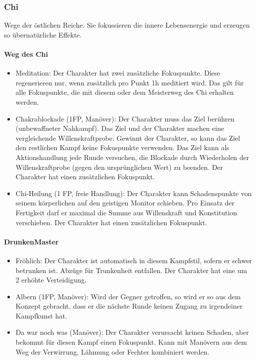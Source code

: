 \documentclass{article}
\begin{document}
\subsubsection{Chi}

Wege der östlichen Reiche. Sie fokussieren die innere Lebensenergie und erzeugen so übernatürliche Effekte.

\paragraph{Weg des Chi}

\begin{itemize}
\item Meditation: Der Charakter hat zwei zusätzliche Fokuspunkte. Diese regenerieren nur, wenn zusätzlich pro Punkt 1h meditiert wird. Das gilt für alle Fokuspunkte, die mit diesem oder dem Meisterweg des Chi erhalten werden.
\item Chakrablockade (1FP, Manöver): Der Charakter muss das Ziel berühren (unbewaffneter Nahkampf). Das Ziel und der Charakter machen eine vergleichende Willenskraftprobe. Gewinnt der Charakter, so kann das Ziel den restlichen Kampf keine Fokuspunkte verwenden. Das Ziel kann als Aktionshandlung jede Runde versuchen, die Blockade durch Wiederholen der Willenskraftprobe (gegen den ursprünglichen Wert) zu beenden. Der Charakter hat einen zusätzlichen Fokuspunkt.
\item Chi-Heilung (1 FP, freie Handlung): Der Charakter kann Schadenspunkte von seinem körperlichen auf den geistigen Monitor schieben. Pro Einsatz der Fertigkeit darf er maximal die Summe aus Willenskraft und Konstitution verschieben. Der Charakter hat einen zusätzlichen Fokuspunkt.
\end{itemize}

\paragraph{DrunkenMaster}

\begin{itemize}
\item Fröhlich: Der Charakter ist automatisch in diesem Kampfstil, sofern er schwer betrunken ist. Abzüge für Trunkenheit entfallen. Der Charakter hat eine um 2 erhöhte Verteidigung.
\item Albern (1FP, Manöver): Wird der Gegner getroffen, so wird er so aus dem Konzept gebracht, dass er die nächste Runde keinen Zugang zu irgendeiner Kampfkunst hat.
\item Da war noch was (Manöver): Der Charakter verursacht keinen Schaden, aber bekommt für diesen Kampf einen Fokuspunkt. Kann mit Manövern aus dem Weg der Verwirrung, Lähmung oder Fechter kombiniert werden.
\end{itemize}
\end{document}
